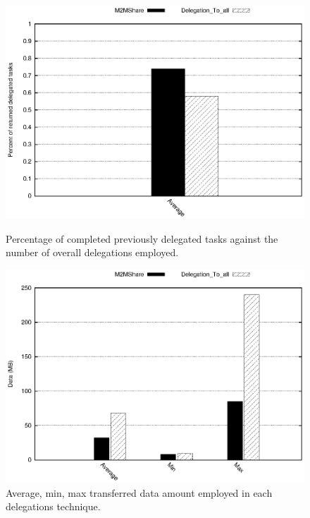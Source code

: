 \begin{figure}[ht]
\begin{minipage}[b]{0.5\linewidth}
\centering
\includegraphics[scale=0.5]{grafici/percDeleghe.eps}
\caption{Percentage of completed previously delegated tasks against the number of overall delegations employed.}
\label{graficoPercDelegheRitornate}
\end{minipage}
\hspace{0.5cm}
\begin{minipage}[b]{0.5\linewidth}
\centering
\includegraphics[scale=0.5]{grafici/data.eps}
\caption{Average, min, max transferred data amount employed in each delegations technique.}
\label{graficoDataDiverseDel}
\end{minipage}
\end{figure}


